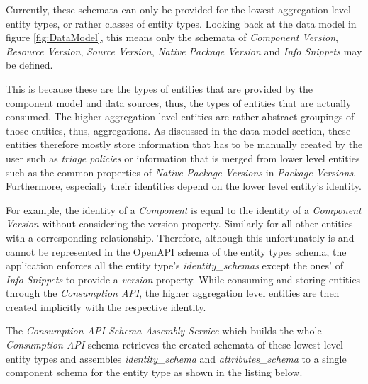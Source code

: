 Currently, these schemata can only be provided for the lowest aggregation level entity types, or rather classes of entity types. Looking back at the data model in figure \ref{fig:DataModel}, this means only the schemata of \emph{Component Version}, \emph{Resource Version}, \emph{Source Version}, \emph{Native Package Version} and \emph{Info Snippets} may be defined.\par 
This is because these are the types of entities that are provided by the component model and data sources, thus, the types of entities that are actually consumed. The higher aggregation level entities are rather abstract groupings of those entities, thus, aggregations. As discussed in the data model section, these entities therefore mostly store information that has to be manually created by the user such as \emph{triage policies} or information that is merged from lower level entities such as the common properties of \emph{Native Package Versions} in \emph{Package Versions}. Furthermore, especially their identities depend on the lower level entity's identity.\par
For example, the identity of a \emph{Component} is equal to the identity of a \emph{Component Version} without considering the version property. Similarly for all other entities with a corresponding relationship. Therefore, although this unfortunately is and cannot be represented in the OpenAPI schema of the entity types schema, the application enforces all the entity type's \emph{identity\_schemas} except the ones' of \emph{Info Snippets} to provide a \emph{version} property. While consuming and storing entities through the \emph{Consumption API}, the higher aggregation level entities are then created implicitly with the respective identity.\par
The \emph{Consumption API Schema Assembly Service} which builds the whole \emph{Consumption API} schema retrieves the created schemata of these lowest level entity types and assembles \emph{identity\_schema} and \emph{attributes\_schema} to a single component schema for the entity type as shown in the listing below.

